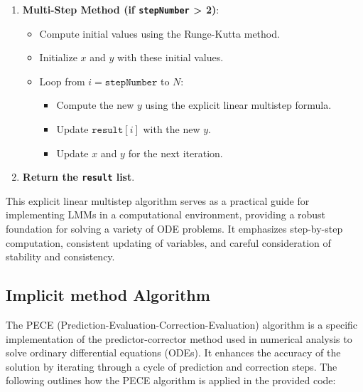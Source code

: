 \documentclass[a4paper, twoside]{report} %
\begin{document}
\begin{enumerate}
		\item \textbf{Multi-Step Method (if \texttt{stepNumber} > 2)}:
		\begin{itemize}
			\item Compute initial values using the Runge-Kutta method.
			\item Initialize $x$ and $y$ with these initial values.
			\item Loop from $i = \texttt{stepNumber}$ to $N$:
			\begin{itemize}
				\item Compute the new $y$ using the explicit linear multistep formula.
				\item Update $\texttt{result}[i]$ with the new $y$.
				\item Update $x$ and $y$ for the next iteration.
			\end{itemize}
		\end{itemize}

		\item \textbf{Return the \texttt{result} list}.
	\end{enumerate}

	This explicit linear multistep algorithm serves as a practical guide for implementing LMMs in a computational environment, providing a robust foundation for solving a variety of ODE problems. It emphasizes step-by-step computation, consistent updating of variables, and careful consideration of stability and consistency.


	\subsection{Implicit method Algorithm}

	The PECE (Prediction-Evaluation-Correction-Evaluation) algorithm is a specific implementation of the predictor-corrector method used in numerical analysis to solve ordinary differential equations (ODEs). It enhances the accuracy of the solution by iterating through a cycle of prediction and correction steps. The following outlines how the PECE algorithm is applied in the provided code:
\end{document}
